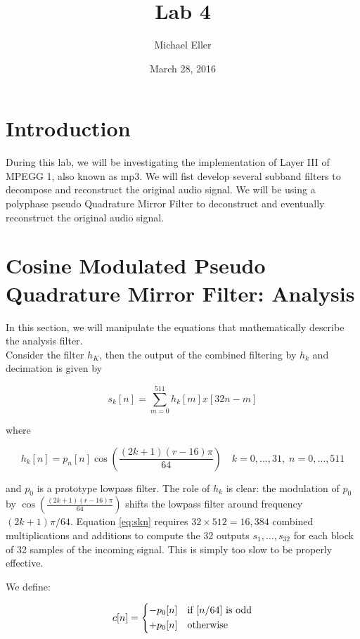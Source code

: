 \documentclass{article} %
\title{Lab 4}
\author{Michael Eller}
\date{March 28, 2016} %
\begin{document}
\maketitle

\tableofcontents
\clearpage
\section{Introduction}

During this lab, we will be investigating the implementation of Layer III
of MPEGG 1, also known as mp3. We will fist develop several subband
filters to decompose and reconstruct the original audio signal. We will
be using a polyphase pseudo Quadrature Mirror Filter to deconstruct
and eventually reconstruct the original audio signal. 

\section{Cosine Modulated Pseudo Quadrature Mirror Filter: Analysis}

In this section, we will manipulate the equations that mathematically
describe the analysis filter. \\


Consider the filter $h_K$, then the output of the combined filtering by $h_k$
and decimation is given by

\begin{equation}
\label{eq:skn}
s_k[n]=\sum\limits_{m=0}^{511} h_k[m]x[32n-m]
\end{equation}

where

\begin{equation}
\label{eq:hkn2}
h_k[n]=p_n[n] \cos \left( \frac{(2k+1)(r-16)\pi}{64}\right)
\quad k=0,\dots,31, \; n=0,\dots,511
\end{equation}

and $p_0$ is a prototype lowpass filter. The role of $h_k$ is clear: the
modulation of $p_0$ by $\cos \left( \frac{(2k+1)(r-16)\pi}{64}\right)$ shifts
the lowpass filter around frequency $(2k+1)\pi/64$. 
Equation \ref{eq:skn} requires $32 \times 512 = 16,384$ combined multiplications
and additions to compute the 32 outputs $s_{1},\dots,s_{32}$ for each block
of 32 samples of the incoming signal. This is simply too slow to be properly
effective. 



We define:

\begin{equation}
\label{eq:cn}
c[n]=
\begin{dcases*}
-p_0[n] & if $[n/64]$ is odd\\
+p_0[n]  & otherwise
\end{dcases*}
\end{equation}
\end{document}
